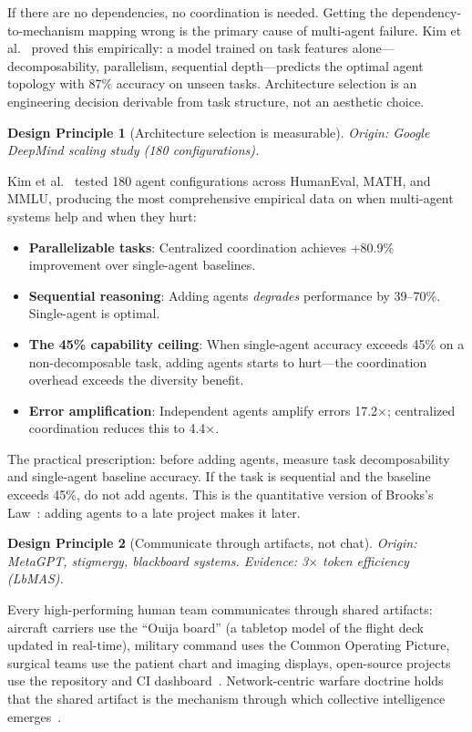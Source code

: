 \documentclass{article}
\newtheorem{principle}{Design Principle}
\begin{document}
\noindent
If there are no dependencies, no coordination is needed. Getting the dependency-to-mechanism
mapping wrong is the primary cause of multi-agent failure. Kim et al.~\citep{kim2025scaling}
proved this empirically: a model trained on task features alone---decomposability, parallelism,
sequential depth---predicts the optimal agent topology with 87\% accuracy on unseen tasks.
Architecture selection is an engineering decision derivable from task structure, not an
aesthetic choice.

\begin{principle}[Architecture selection is measurable]
\emph{Origin}: Google DeepMind scaling study (180 configurations).
\end{principle}

Kim et al.~\citep{kim2025scaling} tested 180 agent configurations across HumanEval,
MATH, and MMLU, producing the most comprehensive empirical data on when multi-agent
systems help and when they hurt:
\begin{itemize}[nosep]
  \item \textbf{Parallelizable tasks}: Centralized coordination achieves +80.9\%
    improvement over single-agent baselines.
  \item \textbf{Sequential reasoning}: Adding agents \emph{degrades} performance by
    39--70\%. Single-agent is optimal.
  \item \textbf{The 45\% capability ceiling}: When single-agent accuracy exceeds 45\% on
    a non-decomposable task, adding agents starts to hurt---the coordination overhead
    exceeds the diversity benefit.
  \item \textbf{Error amplification}: Independent agents amplify errors 17.2$\times$;
    centralized coordination reduces this to 4.4$\times$.
\end{itemize}

\noindent
The practical prescription: before adding agents, measure task decomposability and
single-agent baseline accuracy. If the task is sequential and the baseline exceeds 45\%,
do not add agents. This is the quantitative version of Brooks's
Law~\citep{brooks1975mythical}: adding agents to a late project makes it later.

\begin{principle}[Communicate through artifacts, not chat]
\emph{Origin}: MetaGPT, stigmergy, blackboard systems.
\emph{Evidence}: 3$\times$ token efficiency (LbMAS).
\end{principle}

Every high-performing human team communicates through shared artifacts: aircraft carriers
use the ``Ouija board'' (a tabletop model of the flight deck updated in real-time),
military command uses the Common Operating Picture, surgical teams use the patient chart
and imaging displays, open-source projects use the repository and CI
dashboard~\citep{mcchrystal2015team}. Network-centric warfare doctrine holds that the
shared artifact is the mechanism through which collective intelligence
emerges~\citep{cebrowski1998network}.
\end{document}
